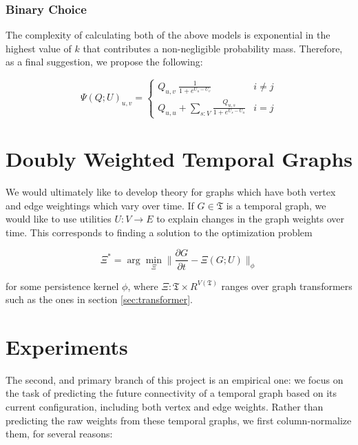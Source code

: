 \documentclass{article}
\theoremstyle{definition}
\begin{document}
	\subsubsection{Binary Choice}
	The complexity of calculating both of the above models is exponential in the highest value of $k$ that contributes a non-negligible probability mass. Therefore, as a final suggestion, we propose the following:
	
	\begin{equation*}
		\Psi(Q;U)_{u,v} = \begin{cases}
			\displaystyle Q_{u,v} ~\frac{\displaystyle 1}{\displaystyle 1 + e^{U_u - U_v}} & i \neq j \\
			\displaystyle Q_{u,u} + \sum_{s: V} \frac{\displaystyle Q_{u,s}}{\displaystyle 1 + e^{U_s - U_u}}& i = j
		\end{cases}
	\end{equation*}
	

	
	

	
	\section{Doubly Weighted Temporal Graphs}
	We would ultimately like to develop theory for graphs which have both vertex and edge weightings which vary over time. If $G \in \mathfrak T$ is a temporal graph, we would like to use utilities $U : V \to E$ to explain changes in the graph weights over time.  This corresponds to finding a solution to the optimization problem
	
	\[ \Xi^* = \arg\min_{\Xi} \Big\lVert \frac{\partial G}{\partial t} - \Xi(G;U)  \Big\rVert_\phi \]
	
	for some persistence kernel $\phi$, where $\Xi: \mathfrak T \times R^{V(\mathfrak T)}$ ranges over graph transformers such as the ones in section \ref{sec:transformer}.
	
	\section{Experiments}
	The second, and primary branch of this project is an empirical one: we focus on the task of predicting the future connectivity of a temporal graph based on its current configuration, including both vertex and edge weights. Rather than predicting the raw weights from these temporal graphs, we first column-normalize them, for several reasons:
	
\end{document}
